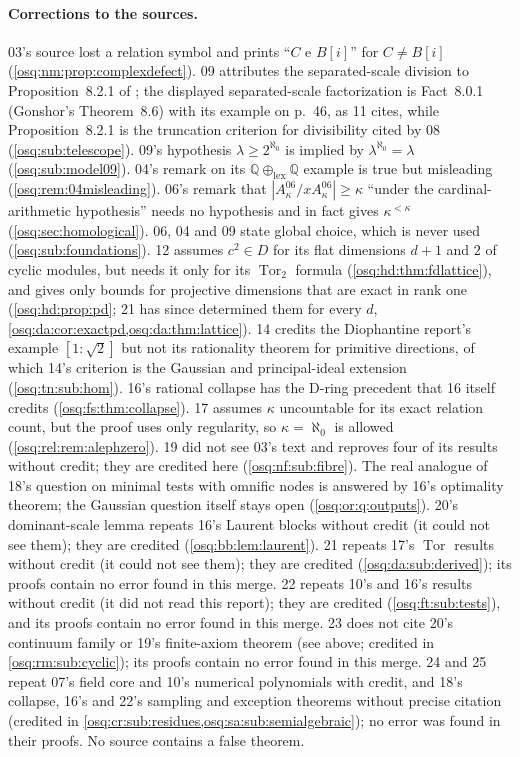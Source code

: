 \documentclass[11pt,letterpaper]{article}
\numberwithin{equation}{section}
\theoremstyle{definition}
\theoremstyle{remark}
\theoremstyle{plain}
\newcommand{\Q}{\mathbb Q}
\newcommand{\Tor}{\operatorname{Tor}}
\begin{document}
\paragraph{Corrections to the sources.} 03's source lost a relation symbol and prints
``$C$ e $B[i]$'' for $C\ne B[i]$ (\cref{osq:nm:prop:complexdefect}). 09 attributes the separated-scale
division to Proposition~8.2.1 of \cite{LM}; the displayed separated-scale factorization is
Fact~8.0.1 (Gonshor's Theorem~8.6) with its example on p.~46, as 11 cites, while
Proposition~8.2.1 is the truncation criterion for divisibility cited by 08
(\cref{osq:sub:telescope}). 09's hypothesis $\lambda\ge2^{\aleph_0}$ is implied by
$\lambda^{\aleph_0}=\lambda$ (\cref{osq:sub:model09}). 04's remark on its $\Q\oplus_{\mathrm{lex}}\Q$
example is true but misleading (\cref{osq:rem:04misleading}). 06's remark that
$|A^{06}_\kappa/xA^{06}_\kappa|\ge\kappa$ ``under the cardinal-arithmetic hypothesis'' needs no
hypothesis and in fact gives $\kappa^{<\kappa}$ (\cref{osq:sec:homological}). 06, 04 and 09 state
global choice, which is never used (\cref{osq:sub:foundations}). 12 assumes $c^2\in D$ for its flat dimensions
$d+1$ and $2$ of cyclic modules, but needs it only for its $\Tor_2$ formula (\cref{osq:hd:thm:fdlattice}), and gives
only bounds for projective dimensions that are exact in rank one (\cref{osq:hd:prop:pd}; 21 has since determined them for every $d$,
\cref{osq:da:cor:exactpd,osq:da:thm:lattice}). 14 credits the
Diophantine report's example $[1:\sqrt2]$ but not its rationality theorem for primitive directions, of which 14's
criterion is the Gaussian and principal-ideal extension (\cref{osq:tn:sub:hom}). 16's rational collapse has the
D-ring precedent that 16 itself credits (\cref{osq:fs:thm:collapse}). 17 assumes $\kappa$ uncountable for its exact
relation count, but the proof uses only regularity, so $\kappa=\aleph_0$ is allowed (\cref{osq:rel:rem:alephzero}). 19 did
not see 03's text and reproves four of its results without credit; they are credited here
(\cref{osq:nf:sub:fibre}). The real analogue of 18's question on minimal tests with omnific nodes is answered by 16's
optimality theorem; the Gaussian question itself stays open (\cref{osq:or:q:outputs}). 20's dominant-scale lemma repeats 16's
Laurent blocks without credit (it could not see them); they are credited (\cref{osq:bb:lem:laurent}). 21 repeats 17's $\Tor$ results without
credit (it could not see them); they are credited (\cref{osq:da:sub:derived}); its proofs contain no error found in this merge. 22 repeats
10's and 16's results without credit (it did not read this report); they are credited (\cref{osq:ft:sub:tests}), and its proofs contain no error
found in this merge. 23 does not cite 20's continuum family or 19's finite-axiom theorem (see above; credited in
\cref{osq:rm:sub:cyclic}); its proofs contain no error found in this merge. 24 and 25 repeat 07's field core and 10's numerical polynomials
with credit, and 18's collapse, 16's and 22's sampling and exception theorems without precise citation (credited in
\cref{osq:cr:sub:residues,osq:sa:sub:semialgebraic}); no error was found in their proofs. No source contains a false theorem.
\end{document}
